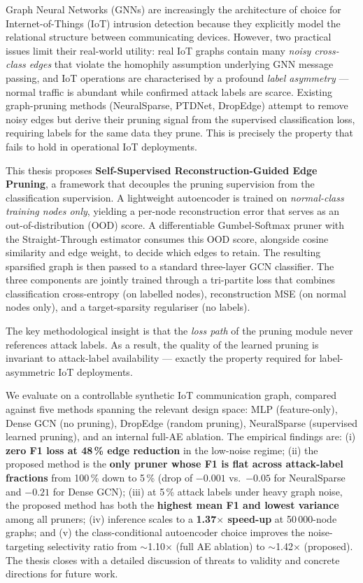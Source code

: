 \documentclass[11pt,a4paper]{report}
\theoremstyle{definition}
\theoremstyle{remark}
\begin{document}
Graph Neural Networks (GNNs) are increasingly the architecture of choice
for Internet-of-Things (IoT) intrusion detection because they explicitly
model the relational structure between communicating devices. However,
two practical issues limit their real-world utility: real IoT graphs
contain many \emph{noisy cross-class edges} that violate the homophily
assumption underlying GNN message passing, and IoT operations are
characterised by a profound \emph{label asymmetry} --- normal traffic is
abundant while confirmed attack labels are scarce. Existing graph-pruning
methods (NeuralSparse, PTDNet, DropEdge) attempt to remove noisy edges
but derive their pruning signal from the supervised classification loss,
requiring labels for the same data they prune. This is precisely the
property that fails to hold in operational IoT deployments.

This thesis proposes \textbf{Self-Supervised Reconstruction-Guided Edge
Pruning}, a framework that decouples the pruning supervision from the
classification supervision. A lightweight autoencoder is trained on
\emph{normal-class training nodes only}, yielding a per-node
reconstruction error that serves as an out-of-distribution (OOD) score.
A differentiable Gumbel-Softmax pruner with the Straight-Through
estimator consumes this OOD score, alongside cosine similarity and edge
weight, to decide which edges to retain. The resulting sparsified graph
is then passed to a standard three-layer GCN classifier. The three
components are jointly trained through a tri-partite loss that combines
classification cross-entropy (on labelled nodes), reconstruction MSE
(on normal nodes only), and a target-sparsity regulariser (no labels).

The key methodological insight is that the \emph{loss path} of the
pruning module never references attack labels. As a result, the
quality of the learned pruning is invariant to attack-label
availability --- exactly the property required for label-asymmetric IoT
deployments.

We evaluate on a controllable synthetic IoT communication graph,
compared against five methods spanning the relevant design space: MLP
(feature-only), Dense GCN (no pruning), DropEdge (random pruning),
NeuralSparse (supervised learned pruning), and an internal full-AE
ablation. The empirical findings are: (i) \textbf{zero F1 loss at
48\,\% edge reduction} in the low-noise regime; (ii) the proposed
method is the \textbf{only pruner whose F1 is flat across attack-label
fractions} from 100\,\% down to 5\,\% (drop of $-0.001$ vs.\ $-0.05$
for NeuralSparse and $-0.21$ for Dense GCN); (iii) at 5\,\% attack
labels under heavy graph noise, the proposed method has both the
\textbf{highest mean F1 and lowest variance} among all pruners;
(iv) inference scales to a \textbf{1.37$\times$ speed-up} at 50\,000-node
graphs; and (v) the class-conditional autoencoder choice improves the
noise-targeting selectivity ratio from $\sim$1.10$\times$ (full AE
ablation) to $\sim$1.42$\times$ (proposed). The thesis closes with a
detailed discussion of threats to validity and concrete directions for
future work.
\end{document}
